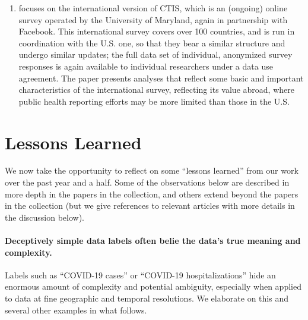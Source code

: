 \documentclass{article}
\begin{document}
\begin{enumerate}
\item \citet{Astley:2021} focuses on the international version of CTIS, which is
  an (ongoing) online survey operated by the University of Maryland, again in
  partnership with Facebook.  This international survey covers over 100
  countries, and is run in coordination with the U.S. one, so that they bear a
  similar structure and undergo similar updates; the full data set of
  individual, anonymized survey responses is again available to individual
  researchers under a data use agreement.  The paper presents analyses that
  reflect some basic and important characteristics of the international survey,
  reflecting its value abroad, where public health reporting efforts may be more
  limited than those in the U.S.
\end{enumerate}

\section{Lessons Learned}

We now take the opportunity to reflect on some ``lessons learned'' from our work
over the past year and a half.  Some of the observations below are described in
more depth in the papers in the collection, and others extend beyond the papers
in the collection (but we give references to relevant articles with more details
in the discussion below). 

\paragraph{Deceptively simple data labels often belie the data's true meaning
  and complexity.}

Labels such as ``COVID-19 cases'' or ``COVID-19 hospitalizations'' hide an
enormous amount of complexity and potential ambiguity, especially when applied
to data at fine geographic and temporal resolutions.  We elaborate on this and
several other examples in what follows. 
\end{document}
